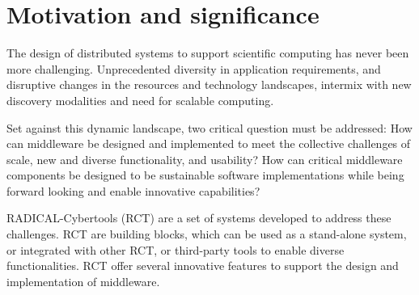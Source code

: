 \documentclass[preprint,12pt, a4paper]{elsarticle}
\begin{document}
\section{Motivation and significance}\label{sec:motivation}


The design of distributed systems to support scientific computing has never
been more challenging. Unprecedented diversity in application requirements,
and disruptive changes in the resources and technology landscapes, intermix
with new discovery modalities and need for scalable computing.

Set against this dynamic landscape, two critical question must be addressed:
How can middleware be designed and implemented to meet the collective
challenges of scale, new and diverse functionality, and usability? How can
critical middleware components be designed to be sustainable software
implementations while being forward looking and enable innovative
capabilities?

RADICAL-Cybertools (RCT) are a set of systems developed to address these
challenges.  RCT are building blocks, which can be used as a stand-alone
system, or integrated with other RCT, or third-party tools to enable diverse
functionalities. RCT offer several innovative features to support the design
and implementation of middleware.
\end{document}
